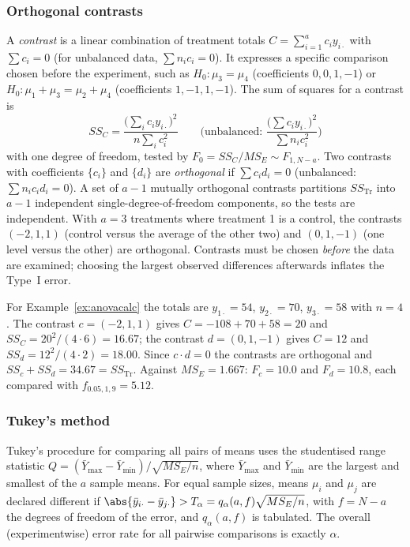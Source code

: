 \subsubsection*{Orthogonal contrasts}

A \emph{contrast} is a linear combination of treatment totals $C=\sum_{i=1}^ac_iy_{i\cdot}$ with $\sum c_i=0$ (for unbalanced data, $\sum n_ic_i=0$). It expresses a specific comparison chosen before the experiment, such as $H_0:\mu_3=\mu_4$ (coefficients $0,0,1,-1$) or $H_0:\mu_1+\mu_3=\mu_2+\mu_4$ (coefficients $1,-1,1,-1$). The sum of squares for a contrast is
\[ SS_C=\frac{\big(\sum_ic_iy_{i\cdot}\big)^2}{n\sum_ic_i^2}\qquad\Big(\text{unbalanced: }\frac{\big(\sum c_iy_{i\cdot}\big)^2}{\sum n_ic_i^2}\Big) \]
with one degree of freedom, tested by $F_0=SS_C/MS_E\sim F_{1,N-a}$. Two contrasts with coefficients $\{c_i\}$ and $\{d_i\}$ are \emph{orthogonal} if $\sum c_id_i=0$ (unbalanced: $\sum n_ic_id_i=0$). A set of $a-1$ mutually orthogonal contrasts partitions $SS_{\mathrm{Tr}}$ into $a-1$ independent single-degree-of-freedom components, so the tests are independent. With $a=3$ treatments where treatment 1 is a control, the contrasts $(-2,1,1)$ (control versus the average of the other two) and $(0,1,-1)$ (one level versus the other) are orthogonal. Contrasts must be chosen \emph{before} the data are examined; choosing the largest observed differences afterwards inflates the Type~I error.

\begin{example}
For Example~\ref{ex:anovacalc} the totals are $y_{1\cdot}=54$, $y_{2\cdot}=70$, $y_{3\cdot}=58$ with $n=4$. The contrast $c=(-2,1,1)$ gives $C=-108+70+58=20$ and $SS_C=20^2/(4\cdot6)=16.67$; the contrast $d=(0,1,-1)$ gives $C=12$ and $SS_d=12^2/(4\cdot2)=18.00$. Since $c\cdot d=0$ the contrasts are orthogonal and $SS_c+SS_d=34.67=SS_{\mathrm{Tr}}$. Against $MS_E=1.667$: $F_c=10.0$ and $F_d=10.8$, each compared with $f_{0.05,1,9}=5.12$.
\end{example}

\subsubsection*{Tukey's method}

Tukey's procedure for comparing all pairs of means uses the studentised range statistic $Q=(\bar{Y}_{\max}-\bar{Y}_{\min})/\sqrt{MS_E/n}$, where $\bar{Y}_{\max}$ and $\bar{Y}_{\min}$ are the largest and smallest of the $a$ sample means. For equal sample sizes, means $\mu_i$ and $\mu_j$ are declared different if $\abs{\bar{y}_{i\cdot}-\bar{y}_{j\cdot}}>T_\alpha=q_\alpha(a,f)\sqrt{MS_E/n}$, with $f=N-a$ the degrees of freedom of the error, and $q_\alpha(a,f)$ is tabulated. The overall (experimentwise) error rate for all pairwise comparisons is exactly $\alpha$.

